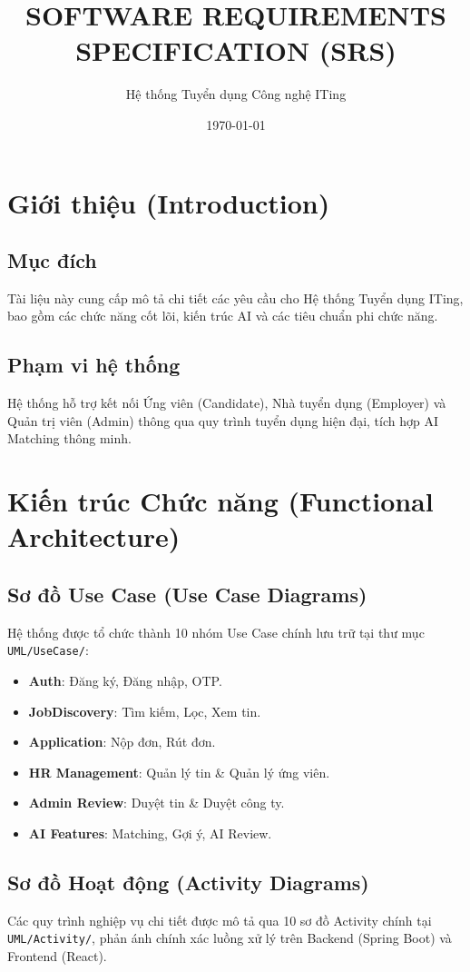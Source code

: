 \documentclass[12pt, a4paper]{report}
\title{\textbf{SOFTWARE REQUIREMENTS SPECIFICATION (SRS)}}
\author{Hệ thống Tuyển dụng Công nghệ ITing}
\date{\today}
\begin{document}
\maketitle
\tableofcontents

\chapter{Giới thiệu (Introduction)}
\section{Mục đích}
Tài liệu này cung cấp mô tả chi tiết các yêu cầu cho Hệ thống Tuyển dụng ITing, bao gồm các chức năng cốt lõi, kiến trúc AI và các tiêu chuẩn phi chức năng.
\section{Phạm vi hệ thống}
Hệ thống hỗ trợ kết nối Ứng viên (Candidate), Nhà tuyển dụng (Employer) và Quản trị viên (Admin) thông qua quy trình tuyển dụng hiện đại, tích hợp AI Matching thông minh.

\chapter{Kiến trúc Chức năng (Functional Architecture)}
\section{Sơ đồ Use Case (Use Case Diagrams)}
Hệ thống được tổ chức thành 10 nhóm Use Case chính lưu trữ tại thư mục \texttt{UML/UseCase/}:
\begin{itemize}
    \item \textbf{Auth}: Đăng ký, Đăng nhập, OTP.
    \item \textbf{JobDiscovery}: Tìm kiếm, Lọc, Xem tin.
    \item \textbf{Application}: Nộp đơn, Rút đơn.
    \item \textbf{HR Management}: Quản lý tin & Quản lý ứng viên.
    \item \textbf{Admin Review}: Duyệt tin & Duyệt công ty.
    \item \textbf{AI Features}: Matching, Gợi ý, AI Review.
\end{itemize}

\section{Sơ đồ Hoạt động (Activity Diagrams)}
Các quy trình nghiệp vụ chi tiết được mô tả qua 10 sơ đồ Activity chính tại \texttt{UML/Activity/}, phản ánh chính xác luồng xử lý trên Backend (Spring Boot) và Frontend (React).
\end{document}
